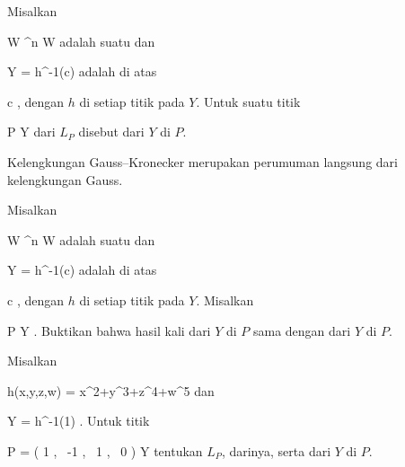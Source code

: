 Misalkan

\mavergleichskette
{\vergleichskette
{ W
}
{ \subseteq }{ \R^n
}
{  }{
}
{    }{
}
{   }{
}
}
{}{}{}
 { W } { \R
} {}
adalah suatu
dan

\mavergleichskette
{\vergleichskette
{ Y
}
{ = }{ h^{-1}(c)
}
{  }{
}
{    }{
}
{   }{
}
}
{}{}{}
adalah
di atas

\mavergleichskette
{\vergleichskette
{ c
}
{ \in }{ \R
}
{  }{
}
{    }{
}
{   }{
}
}
{}{}{,}
dengan $h$
di setiap titik pada $Y$. Untuk suatu titik

\mavergleichskette
{\vergleichskette
{ P
}
{ \in }{ Y
}
{  }{
}
{    }{
}
{   }{
}
}
{}{}{}
dari
$L_P$ disebut
dari $Y$ di $P$.

Kelengkungan Gauss--Kronecker merupakan perumuman langsung dari kelengkungan Gauss.

{}
{

Misalkan

\mavergleichskette
{\vergleichskette
{ W
}
{ \subseteq }{ \R^n
}
{  }{
}
{    }{
}
{   }{
}
}
{}{}{}
 { W } { \R
} {}
adalah suatu
dan

\mavergleichskette
{\vergleichskette
{ Y
}
{ = }{ h^{-1}(c)
}
{  }{
}
{    }{
}
{   }{
}
}
{}{}{}
adalah
di atas

\mavergleichskette
{\vergleichskette
{ c
}
{ \in }{ \R
}
{  }{
}
{    }{
}
{   }{
}
}
{}{}{,}
dengan $h$
di setiap titik pada $Y$. Misalkan

\mavergleichskette
{\vergleichskette
{ P
}
{ \in }{ Y
}
{  }{
}
{    }{
}
{   }{
}
}
{}{}{.}
Buktikan bahwa hasil kali
dari $Y$ di $P$ sama dengan
dari $Y$ di $P$.

}
{} {}

{}
{

Misalkan

\mavergleichskettedisp
{\vergleichskette
{ h(x,y,z,w)
}
{ =} { x^2+y^3+z^4+w^5
}
{ } {
}
{ } {
}
{ } {
}
}
{}{}{}
dan

\mavergleichskette
{\vergleichskette
{ Y
}
{ = }{ h^{-1}(1)
}
{  }{
}
{    }{
}
{   }{
}
}
{}{}{.}
Untuk titik

\mavergleichskettedisp
{\vergleichskette
{ P
}
{ =} { \left(  1   , \,   -1  , \,   1 , \,   0                \right)
}
{ \in} { Y
}
{ } {
}
{ } {
}
}
{}{}{}
tentukan
$L_P$,
darinya, serta
dari $Y$ di $P$.

}
{} {}

